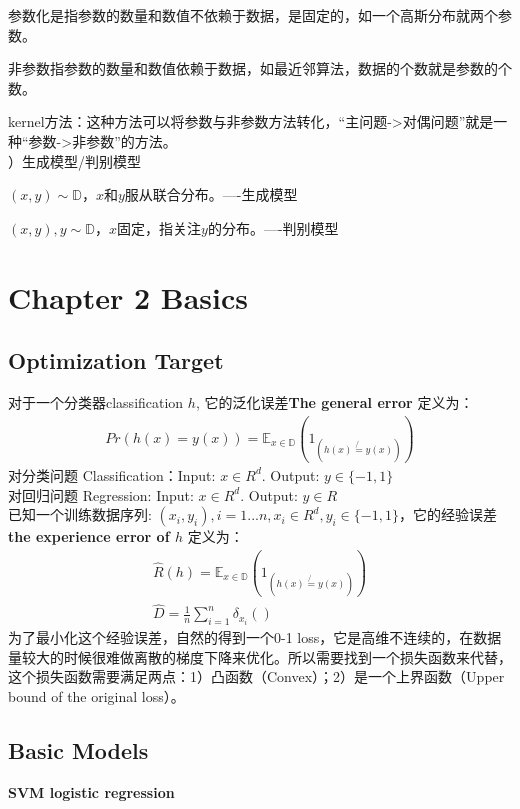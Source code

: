 \documentclass[12pt,UTF8,AutoFakeBold]{article}
\begin{document}
    参数化是指参数的数量和数值不依赖于数据，是固定的，如一个高斯分布就两个参数。
    
    非参数指参数的数量和数值依赖于数据，如最近邻算法，数据的个数就是参数的个数。
    
    kernel方法：这种方法可以将参数与非参数方法转化，“主问题->对偶问题”就是一种“参数->非参数”的方法。\\
{）生成模型/判别模型}

    \((x,y)\sim{\mathbb{D}}\)，\(x\)和\(y\)服从联合分布。----生成模型
    
    \((x,y), y\sim{\mathbb{D}}\)，\(x\)固定，指关注\(y\)的分布。----判别模型
    
\newpage

\newpage
\section{Chapter 2  Basics}
\subsection{Optimization Target}
对于一个分类器classification \(h\), 它的泛化误差{\textbf{The general error}} 定义为：
\begin{gather}
Pr(h(x)=y(x)) = \mathbb{E}_{x\in{\mathbb{D}}}(1_{(h(x)\not{=}y(x))})
\end{gather}
对分类问题 Classification：Input: \(x\in{R^{d}}\).  Output: \(y\in{\{-1,1\}}\)\\
对回归问题 Regression: Input: \(x\in{R^{d}}\).  Output: \(y\in{{R}}\)\\
已知一个训练数据序列: \({(x_i,y_i), i=1...n}, x_i\in{R^d}, y_i\in{\{-1,1\}}\)，它的经验误差 {\textbf{the experience error of \(h\)}} 定义为：
\begin{gather}
\widehat{R}(h) = \mathbb{E}_{x\in{\mathbb{D}}}(1_{(h(x)\not{=}y(x))})\\
\widehat{D} = \frac{1}{n}\sum _{i=1}^{n}{{\delta}_{{x}_{i}}()}
\end{gather}
为了最小化这个经验误差，自然的得到一个{0-1 loss}，它是高维不连续的，在数据量较大的时候很难做离散的梯度下降来优化。所以需要找到一个损失函数来代替，这个损失函数需要满足两点：1）凸函数（Convex）；2）是一个上界函数（Upper bound of the original loss）。

\subsection{Basic Models}

{\bfseries\kaishu SVM logistic regression}
\end{document}
